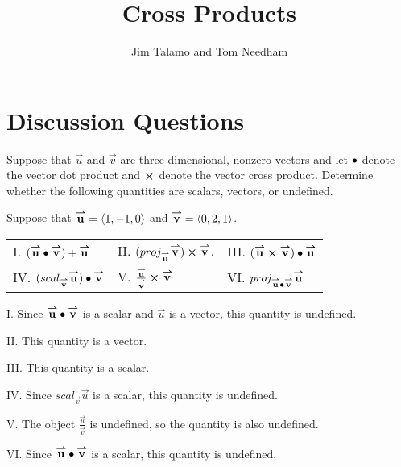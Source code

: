 \documentclass[]{ximera}
\author{Jim Talamo and Tom Needham}
\title[Collaborate:]{Cross Products}
\begin{document}
\begin{abstract}
\end{abstract}
\maketitle

\section{Discussion Questions}

\begin{problem}
Suppose that $\vec{u}$ and $\vec{v}$ are three dimensional, nonzero vectors and let $\dotp$ denote the vector dot product and $\cross$ denote the vector cross product.  Determine whether the following quantities are scalars, vectors, or undefined. 

Suppose that $\vec{u} = \vector{1,-1,0}$ and $\vec{v} = \vector{0,2,1}$.

\begin{tabular}{lll}
I. $(\vec{u} \dotp \vec{v})+\vec{u}$ \qquad \qquad \qquad & II. $(proj_{\vec{u}} \vec{v}) \cross \vec{v}$.   \qquad \qquad  & III. $(\vec{u} \cross \vec{v}) \dotp \vec{u}$\\[2ex]
IV. $(scal_{\vec{v}} \vec{u}) \dotp \vec{v}$ & V. $\frac{\vec{u}}{\vec{v}} \cross \vec{v}$ & VI. $proj_{\vec{u} \dotp \vec{v}} \vec{u}$
\end{tabular}

\begin{solution}
I. Since $\vec{u} \dotp \vec{v}$ is a scalar and $\vec{u}$ is a vector, this quantity is undefined.

II. This quantity is a vector.

III. This quantity is a scalar.

IV. Since $scal_{\vec{v}} \vec{u}$ is a scalar, this quantity is undefined. 

V. The object $\frac{\vec{u}}{\vec{v}}$ is undefined, so the quantity is also undefined. 

VI. Since $\vec{u} \dotp \vec{v}$ is a scalar, this quantity is undefined. 
\end{solution}

\end{problem}
\end{document}
